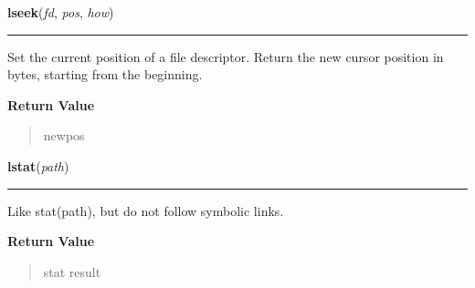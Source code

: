 \hspace{.8\funcindent}\begin{boxedminipage}{\funcwidth}

    \raggedright \textbf{lseek}(\textit{fd}, \textit{pos}, \textit{how})

    \vspace{-1.5ex}

    \rule{\textwidth}{0.5\fboxrule}
\setlength{\parskip}{2ex}
    Set the current position of a file descriptor. Return the new cursor 
    position in bytes, starting from the beginning.

\setlength{\parskip}{1ex}
      \textbf{Return Value}
    \vspace{-1ex}

      \begin{quote}
      newpos

      \end{quote}

    \end{boxedminipage}

    \label{os:lstat}

    \vspace{0.5ex}

\hspace{.8\funcindent}\begin{boxedminipage}{\funcwidth}

    \raggedright \textbf{lstat}(\textit{path})

    \vspace{-1.5ex}

    \rule{\textwidth}{0.5\fboxrule}
\setlength{\parskip}{2ex}
    Like stat(path), but do not follow symbolic links.

\setlength{\parskip}{1ex}
      \textbf{Return Value}
    \vspace{-1ex}

      \begin{quote}
      stat result

      \end{quote}

    \end{boxedminipage}

    \label{os:major}

    \vspace{0.5ex}

